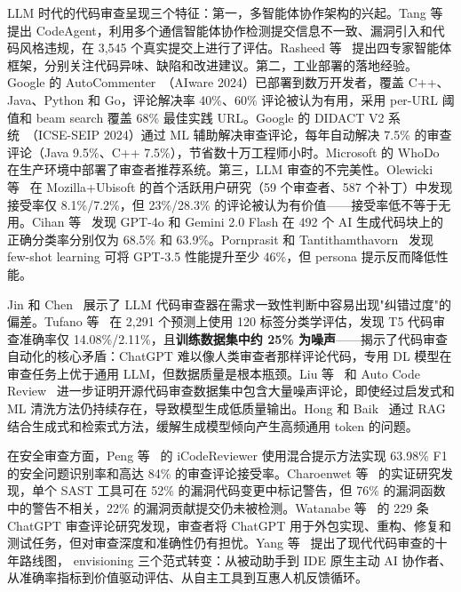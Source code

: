 \documentclass[11pt,a4paper,onecolumn]{article}
\begin{document}
LLM 时代的代码审查呈现三个特征：第一，多智能体协作架构的兴起。Tang 等~\cite{tang_2024_codeagent} 提出 CodeAgent，利用多个通信智能体协作检测提交信息不一致、漏洞引入和代码风格违规，在 3,545 个真实提交上进行了评估。Rasheed 等~\cite{rasheed_2024_ai_powered} 提出四专家智能体框架，分别关注代码异味、缺陷和改进建议。第二，工业部署的落地经验。Google 的 AutoCommenter~\cite{vijayvergiya_2024_autocommenter}（AIware 2024）已部署到数万开发者，覆盖 C++、Java、Python 和 Go，评论解决率 40\%、60\% 评论被认为有用，采用 per-URL 阈值和 beam search 覆盖 68\% 最佳实践 URL。Google 的 DIDACT V2 系统~\cite{frommgen_2024_resolving}（ICSE-SEIP 2024）通过 ML 辅助解决审查评论，每年自动解决 7.5\% 的审查评论（Java 9.5\%、C++ 7.5\%），节省数十万工程师小时。Microsoft 的 WhoDo~\cite{asthana_2024_whodo} 在生产环境中部署了审查者推荐系统。第三，LLM 审查的不完美性。Olewicki 等~\cite{olewicki_2024_llm_review_impact} 在 Mozilla+Ubisoft 的首个活跃用户研究（59 个审查者、587 个补丁）中发现接受率仅 8.1\%/7.2\%，但 23\%/28.3\% 的评论被认为有价值——接受率低不等于无用。Cihan 等~\cite{cihan_2025_llm_review_eval} 发现 GPT-4o 和 Gemini 2.0 Flash 在 492 个 AI 生成代码块上的正确分类率分别仅为 68.5\% 和 63.9\%。Pornprasit 和 Tantithamthavorn~\cite{pornprasit_2024_gpt35} 发现 few-shot learning 可将 GPT-3.5 性能提升至少 46\%，但 persona 提示反而降低性能。

Jin 和 Chen~\cite{overcorrection_2026} 展示了 LLM 代码审查器在需求一致性判断中容易出现"纠错过度"的偏差。Tufano 等~\cite{tufano_2024_strengths_weaknesses} 在 2,291 个预测上使用 120 标签分类学评估，发现 T5 代码审查准确率仅 14.08\%/2.11\%，且\textbf{训练数据集中约 25\% 为噪声}——揭示了代码审查自动化的核心矛盾：ChatGPT 难以像人类审查者那样评论代码，专用 DL 模型在审查任务上优于通用 LLM，但数据质量是根本瓶颈。Liu 等~\cite{liu_2025_noisy_data} 和 Auto Code Review~\cite{auto_code_review_2024} 进一步证明开源代码审查数据集中包含大量噪声评论，即使经过启发式和 ML 清洗方法仍持续存在，导致模型生成低质量输出。Hong 和 Baik~\cite{hong_2025_rag_review} 通过 RAG 结合生成式和检索式方法，缓解生成模型倾向产生高频通用 token 的问题。

在安全审查方面，Peng 等~\cite{peng_2025_icodereviewer} 的 iCodeReviewer 使用混合提示方法实现 63.98\% F1 的安全问题识别率和高达 84\% 的审查评论接受率。Charoenwet 等~\cite{charoenwet_2024_sast_secure_review} 的实证研究发现，单个 SAST 工具可在 52\% 的漏洞代码变更中标记警告，但 76\% 的漏洞函数中的警告不相关，22\% 的漏洞贡献提交仍未被检测。Watanabe 等~\cite{watanabe_2024_chatgpt} 的 229 条 ChatGPT 审查评论研究发现，审查者将 ChatGPT 用于外包实现、重构、修复和测试任务，但对审查深度和准确性仍有担忧。Yang 等~\cite{yang_2026_roadmap} 提出了现代代码审查的十年路线图， envisioning 三个范式转变：从被动助手到 IDE 原生主动 AI 协作者、从准确率指标到价值驱动评估、从自主工具到互惠人机反馈循环。
\end{document}
